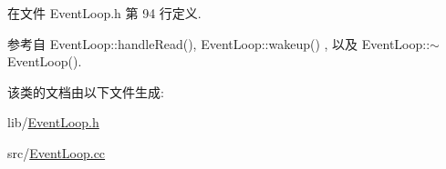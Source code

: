 在文件 Event\+Loop.\+h 第 94 行定义.



参考自 Event\+Loop\+::handle\+Read(), Event\+Loop\+::wakeup() , 以及 Event\+Loop\+::$\sim$\+Event\+Loop().



该类的文档由以下文件生成\+:\begin{DoxyCompactItemize}
\item 
lib/\hyperlink{EventLoop_8h}{Event\+Loop.\+h}\item 
src/\hyperlink{EventLoop_8cc}{Event\+Loop.\+cc}\end{DoxyCompactItemize}
